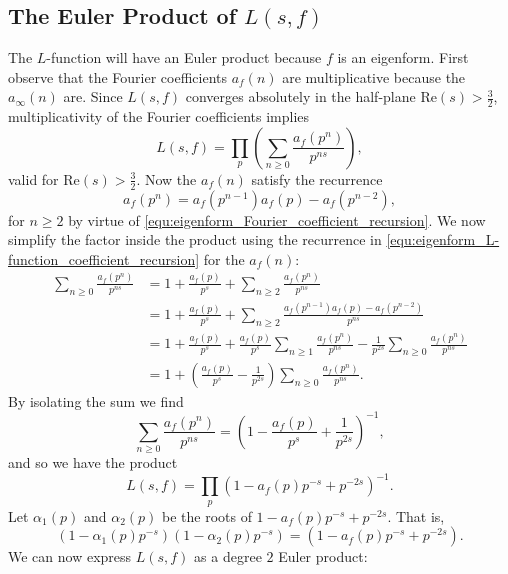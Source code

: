 \documentclass[12pt]{book}
\theoremstyle{definition}\newframedtheorem{method}{Method}
\renewcommand{\a}{\alpha}
\newcommand{\<}{\langle}
\renewcommand{\>}{\rangle}
\renewcommand{\Re}{\mathrm{Re}}
\begin{document}
    \subsection*{The Euler Product of \texorpdfstring{$L(s,f)$}{L(s,f)}}
      The $L$-function will have an Euler product because $f$ is an eigenform. First observe that the Fourier coefficients $a_{f}(n)$ are multiplicative because the $a_{\infty}(n)$ are. Since $L(s,f)$ converges absolutely in the half-plane $\Re(s) > \frac{3}{2}$, multiplicativity of the Fourier coefficients implies
      \[
        L(s,f) = \prod_{p}\left(\sum_{n \ge 0}\frac{a_{f}(p^{n})}{p^{ns}}\right),
      \]
      valid for $\Re(s) > \frac{3}{2}$. Now the $a_{f}(n)$ satisfy the recurrence
      \begin{equation}\label{equ:eigenform_L-function_coefficient_recursion}
        a_{f}(p^{n}) = a_{f}(p^{n-1})a_{f}(p)-a_{f}(p^{n-2}),
      \end{equation}
      for $n \ge 2$ by virtue of \cref{equ:eigenform_Fourier_coefficient_recursion}. We now simplify the factor inside the product using the recurrence in \cref{equ:eigenform_L-function_coefficient_recursion} for the $a_{f}(n)$:
      \begin{align*}
        \sum_{n \ge 0}\frac{a_{f}(p^{n})}{p^{ns}} &= 1+\frac{a_{f}(p)}{p^{s}}+\sum_{n \ge 2}\frac{a_{f}(p^{n})}{p^{ns}} \\
        &= 1+\frac{a_{f}(p)}{p^{s}}+\sum_{n \ge 2}\frac{a_{f}(p^{n-1})a_{f}(p)-a_{f}(p^{n-2})}{p^{ns}} \\
        &= 1+\frac{a_{f}(p)}{p^{s}}+\frac{a_{f}(p)}{p^{s}}\sum_{n \ge 1}\frac{a_{f}(p^{n})}{p^{ns}}-\frac{1}{p^{2s}}\sum_{n \ge 0}\frac{a_{f}(p^{n})}{p^{ns}} \\
        &= 1+\left(\frac{a_{f}(p)}{p^{s}}-\frac{1}{p^{2s}}\right)\sum_{n \ge 0}\frac{a_{f}(p^{n})}{p^{ns}}.
      \end{align*}
      By isolating the sum we find
      \[
        \sum_{n \ge 0}\frac{a_{f}(p^{n})}{p^{ns}} = \left(1-\frac{a_{f}(p)}{p^{s}}+\frac{1}{p^{2s}}\right)^{-1},
      \]
      and so we have the product
      \[
        L(s,f) = \prod_{p}(1-a_{f}(p)p^{-s}+p^{-2s})^{-1}.
      \]
      Let $\a_{1}(p)$ and $\a_{2}(p)$ be the roots of $1-a_{f}(p)p^{-s}+p^{-2s}$. That is,
      \begin{equation}\label{equ:local_parameter_definition_modfular_forms}
        (1-\a_{1}(p)p^{-s})(1-\a_{2}(p)p^{-s}) = (1-a_{f}(p)p^{-s}+p^{-2s}).
      \end{equation}
      We can now express $L(s,f)$ as a degree $2$ Euler product:
\end{document}
